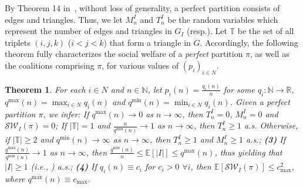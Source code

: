 \documentclass[letterpaper]{article} %
\newtheorem{theorem}{Theorem}
\begin{document}
By Theorem 14 in~\cite{peters2016complexity}, without loss of generality, a perfect partition consists of edges and triangles. Thus, we let $M_n^I$ and $T_n^I$ be the random variables which represent the number of edges and triangles in $G_I$ (resp.). Let $\mathbb{T}$ be the set of all triplets $(i,j,k)$ ($i<j<k$) that form a triangle in $G$. Accordingly, the following theorem fully characterizes the social welfare of a \textit{perfect} partition $\pi$, as well as the coalitions comprising $\pi$, for various values of $(p_i)_{i \in N}$.
\begin{theorem}
\label{theorem:perfect}
For each $i \in N$ and $n \in \mathbb{N}$, let $p_i(n) = \frac{q_i(n)}{n}$ for some $q_i : \mathbb{N} \rightarrow \mathbb{R}$, $q^{\max}(n) = \max_{i \in N} q_i(n)$ and $q^{\min}(n) = \min_{i \in N} q_i(n)$. Given a perfect partition $\pi$, we infer: {} If $q^{\max}(n) \rightarrow 0$ as $n \rightarrow \infty$, then $T_n^I = 0$, $M_n^I = 0$ and $\mathcal{SW}_I(\pi) = 0$; {} If $|\mathbb{T}| = 1$ and $\frac{n}{q^{\min}(n)} \rightarrow 1$ as $n \rightarrow \infty$, then $T_n^I \geq 1$ a.s. Otherwise, if $|\mathbb{T}| \geq 2$ and $q^{\min}(n) \rightarrow \infty$ as $n \rightarrow \infty$, then $T_n^I \geq 1$ and $M_n^I \geq 1$ a.s.; {\normalfont \textbf{(3)}} If $\frac{q^{\max}(n)}{q^{\min}(n)} \rightarrow 1$ as $n \rightarrow \infty$, then $\frac{q^{\min}(n)}{n} \leq \mathbb{E}[|I|] \leq q^{\max}(n)$, thus yielding that $|I| \geq 1$ (i.e., {}) a.s.; {\normalfont \textbf{(4)}} If $q_i(n) \equiv c_i$ for $c_i > 0$ $\forall i$, then $\mathbb{E}[\mathcal{SW}_I(\pi)] \leq c_{\max}^2$, where $q^{\max}(n) \equiv c_{\max}$.

\end{theorem}
\end{document}

